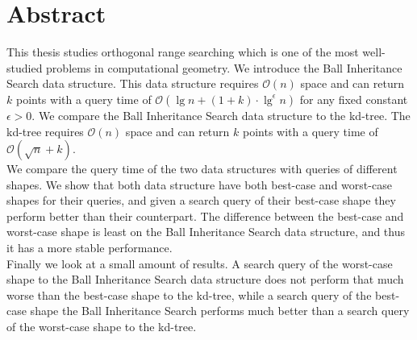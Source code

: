 \documentclass[twoside,11pt,openright]{report}
\begin{document}
\pagestyle{empty} 
\vspace*{\fill}
\clearpage


\pagestyle{plain}
\chapter*{Abstract}

This thesis studies orthogonal range searching which is one of the most well-studied problems in computational geometry. We introduce the Ball Inheritance Search data structure. This data structure requires $\mathcal{O}(n)$ space and can return $k$ points with a query time of $\mathcal{O}(\lg n + (1+k)\cdot\lg^\epsilon n)$ for any fixed constant $\epsilon > 0$. We compare the Ball Inheritance Search data structure to the kd-tree. The kd-tree requires $\mathcal{O}(n)$ space and can return $k$ points with a query time of $\mathcal{O}(\sqrt{n} + k)$.\\

We compare the query time of the two data structures with queries of different shapes. We show that both data structure have both best-case and worst-case shapes for their queries, and given a search query of their best-case shape they perform better than their counterpart. The difference between the best-case and worst-case shape is least on the Ball Inheritance Search data structure, and thus it has a more stable performance.\\

Finally we look at a small amount of results. A search query of the worst-case shape to the Ball Inheritance Search data structure does not perform that much worse than the best-case shape to the kd-tree, while a search query of the best-case shape the Ball Inheritance Search performs much better than a search query of the worst-case shape to the kd-tree.
\end{document}
